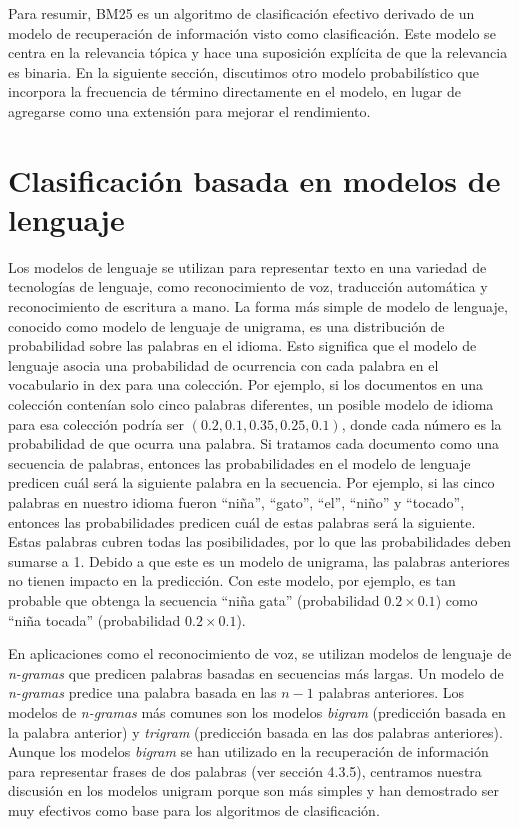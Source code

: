 Para resumir, BM25 es un algoritmo de clasificación efectivo derivado de un modelo de recuperación de información visto como clasificación. Este modelo se centra en la relevancia tópica y hace una suposición explícita de que la relevancia es binaria. En la siguiente sección, discutimos otro modelo probabilístico que incorpora la frecuencia de término directamente en el modelo, en lugar de agregarse como una extensión para mejorar el rendimiento.

\section{Clasificación basada en modelos de lenguaje}

Los modelos de lenguaje se utilizan para representar texto en una variedad de tecnologías de lenguaje, como reconocimiento de voz, traducción automática y reconocimiento de escritura a mano. La forma más simple de modelo de lenguaje, conocido como modelo de lenguaje de unigrama, es una distribución de probabilidad sobre las palabras en el idioma. Esto significa que el modelo de lenguaje asocia una probabilidad de ocurrencia con cada palabra en el vocabulario in dex para una colección. Por ejemplo, si los documentos en una colección contenían solo cinco palabras diferentes, un posible modelo de idioma para esa colección podría ser $(0.2, 0.1, 0.35, 0.25, 0.1)$, donde cada número es la probabilidad de que ocurra una palabra. Si tratamos cada documento como una secuencia de palabras, entonces las probabilidades en el modelo de lenguaje predicen cuál será la siguiente palabra en la secuencia. Por ejemplo, si las cinco palabras en nuestro idioma fueron ``niña'', ``gato'', ``el'', ``niño'' y ``tocado'', entonces las probabilidades predicen cuál de estas palabras será la siguiente. Estas palabras cubren todas las posibilidades, por lo que las probabilidades deben sumarse a 1. Debido a que este es un modelo de unigrama, las palabras anteriores no tienen impacto en la predicción. Con este modelo, por ejemplo, es tan probable que obtenga la secuencia ``niña gata'' (probabilidad $0.2 \times 0.1$) como ``niña tocada'' (probabilidad $0.2 \times 0.1$).

En aplicaciones como el reconocimiento de voz, se utilizan modelos de lenguaje de \textit{n-gramas} que predicen palabras basadas en secuencias más largas. Un modelo de \textit{n-gramas} predice una palabra basada en las $n - 1$ palabras anteriores. Los modelos de \textit{n-gramas} más comunes son los modelos \textit{bigram} (predicción basada en la palabra anterior) y \textit{trigram} (predicción basada en las dos palabras anteriores). Aunque los modelos \textit{bigram} se han utilizado en la recuperación de información para representar frases de dos palabras (ver sección 4.3.5), centramos nuestra discusión en los modelos unigram porque son más simples y han demostrado ser muy efectivos como base para los algoritmos de clasificación.

